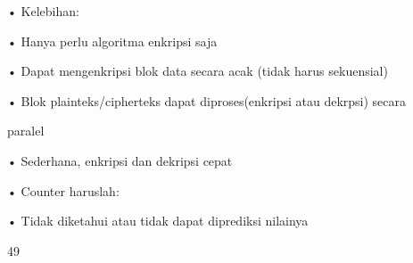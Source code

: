 \documentclass{article}
\begin{document}

• Kelebihan:  

• Hanya perlu algoritma enkripsi  saja

• Dapat mengenkripsi blok data secara acak (tidak harus sekuensial)

• Blok plainteks/cipherteks dapat diproses(enkripsi atau dekrpsi) secara 

paralel

• Sederhana, enkripsi dan dekripsi cepat

• Counter haruslah: 

• Tidak diketahui atau tidak dapat diprediksi nilainya

49
\end{document}
